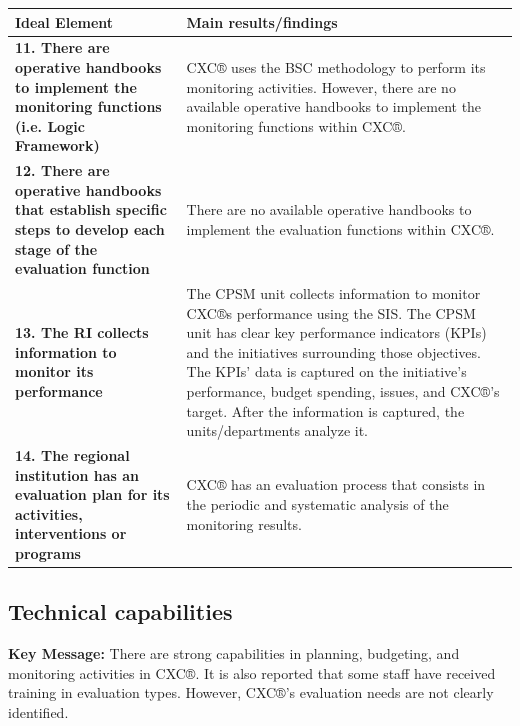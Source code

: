 \documentclass[
  10pt,
]{book}
\begin{document}
\begin{tabu} to 
\hline
Ideal Element & Main results/findings\\
\hline
\textbf{11. There are operative handbooks to implement the monitoring functions (i.e. Logic Framework)} & CXC® uses the BSC methodology to perform its monitoring activities. However, there are no available operative handbooks to implement the monitoring functions within CXC®.\\
\hline
\textbf{12. There are operative handbooks that establish specific steps to develop each stage of the evaluation function} & There are no available operative handbooks to implement the evaluation functions within CXC®.\\
\hline
\textbf{13. The RI collects information to monitor its performance} & The CPSM unit collects information to monitor CXC®s performance using the SIS. The CPSM unit has clear key performance indicators (KPIs) and the initiatives surrounding those objectives. The KPIs’ data is captured on the initiative’s performance, budget spending, issues, and CXC®’s target. After the information is captured, the units/departments analyze it.\\
\hline
\textbf{14. The regional institution has an evaluation plan for its activities, interventions or programs} & CXC® has an evaluation process that consists in the periodic and systematic analysis of the monitoring results.\\
\hline
\end{tabu}
\endgroup{}

\hypertarget{technical-capabilities}{%
\subsection{Technical capabilities}\label{technical-capabilities}}

\textbf{Key Message:}
There are strong capabilities in planning, budgeting, and monitoring activities in CXC®. It is also reported that some staff have received training in evaluation types. However, CXC®'s evaluation needs are not clearly identified.

\begingroup\fontsize{12}{14}\selectfont
\end{document}
